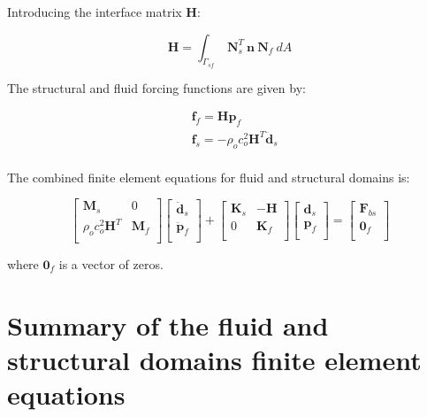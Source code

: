\documentclass[3p]{elsarticle}
\begin{document}
\noindent Introducing the interface matrix $\mathbf{H}$:

\begin{equation}
\label{eqn:Int_6}
    \mathbf{H} = \int_{\Gamma_{sf}}~\mathbf{N}_s^T~\mathbf{n}~\mathbf{N}_f~dA
\end{equation}

\noindent The structural and fluid forcing functions are given by:

\begin{equation}
\label{eqn:Int_7}
    \begin{aligned}
    &\mathbf{f}_f = \mathbf{H}\mathbf{p}_f\\
    &\mathbf{f}_s = -\rho_oc_o^2\mathbf{H}^T\mathbf{\ddot{d}}_s\\
    \end{aligned}
\end{equation}

\noindent The combined finite element equations for fluid and structural domains is:

\begin{equation}
\label{eqn:Int_8}
    \begin{bmatrix}
\mathbf{M}_s & 0\\
\rho_oc_o^2\mathbf{H}^T & \mathbf{M}_f\\
\end{bmatrix} \begin{bmatrix}
\mathbf{\ddot{d}}_s\\
\mathbf{\ddot{p}}_f\\
\end{bmatrix} + \begin{bmatrix}
\mathbf{K}_s & -\mathbf{H}\\
0 & \mathbf{K}_f\\
\end{bmatrix} \begin{bmatrix}
\mathbf{{d}}_s\\
\mathbf{{p}}_f\\
\end{bmatrix} = \begin{bmatrix}
\mathbf{F}_{bs}\\
\mathbf{0}_f\\
\end{bmatrix}
\end{equation}

\noindent where $\mathbf{0}_f$ is a vector of zeros.

\section{Summary of the fluid and structural domains finite element equations}
\end{document}
